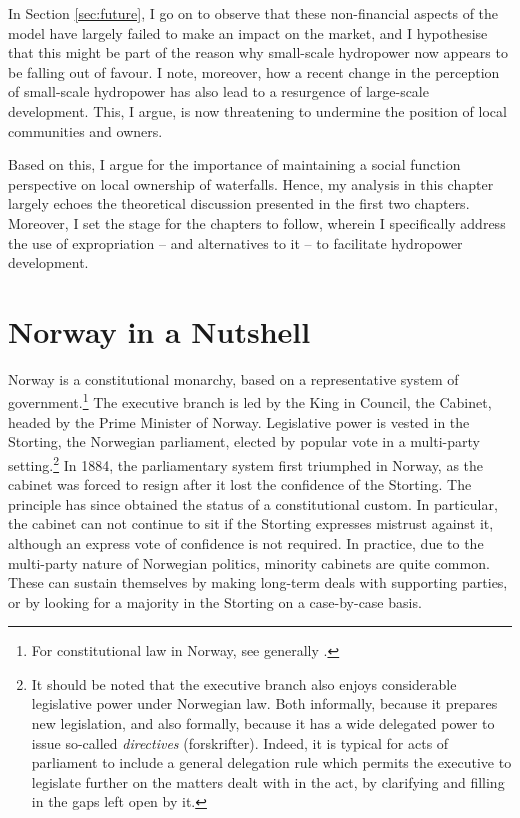 In Section \ref{sec:future}, I go on to observe that these non-financial aspects of the model have largely failed to make an impact on the market, and I hypothesise that this might be part of the reason why small-scale hydropower now appears to be falling out of favour. I note, moreover, how a recent change in the perception of small-scale hydropower has also lead to a resurgence of large-scale development. This, I argue, is now threatening to undermine the position of local communities and owners.

Based on this, I argue for the importance of maintaining a social function perspective on local ownership of waterfalls. Hence, my analysis in this chapter largely echoes the theoretical discussion presented in the first two chapters. Moreover, I set the stage for the chapters to follow, wherein I specifically address the use of expropriation -- and alternatives to it --  to facilitate hydropower development.

\section{Norway in a Nutshell}\label{sec:nutshell}

Norway is a constitutional monarchy, based on a representative system of government.\footnote{For constitutional law in Norway, see generally \cite{andenes06}.} The executive branch is led by the King in Council, the Cabinet, headed by the Prime Minister of Norway. Legislative power is vested in the Storting, the Norwegian parliament, elected by popular vote in a multi-party setting.\footnote{It should be noted that the executive branch also enjoys considerable legislative power under Norwegian law. Both informally, because it prepares new legislation, and also formally, because it has a wide delegated power to issue so-called {\it directives} (forskrifter). Indeed, it is typical for acts of parliament to include a general delegation rule which permits the executive to legislate further on the matters dealt with in the act, by clarifying and filling in the gaps left open by it.} In 1884, the parliamentary system first triumphed in Norway, as the cabinet was forced to resign after it lost the confidence of the Storting. The principle has since obtained the status of a constitutional custom. In particular, the cabinet can not continue to sit if the Storting expresses mistrust against it, although an express vote of confidence is not required. In practice, due to the multi-party nature of Norwegian politics, minority cabinets are quite common. These can sustain themselves by making long-term deals with supporting parties, or by looking for a majority in the Storting on a case-by-case basis.

